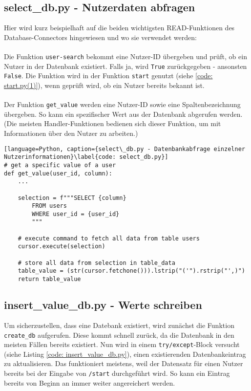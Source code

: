         \subsection{select\_db.py - Nutzerdaten abfragen} \label{Implementierung: select_db.py}
            Hier wird kurz beispielhaft auf die beiden wichtigsten READ-Funktionen des Database-Connectors hingewiesen und wo sie verwendet werden: \\
            \\
            Die Funktion \verb|user-search| bekommt eine Nutzer-ID übergeben und prüft, ob ein Nutzer in der Datenbank existiert. Falls ja, wird \verb|True| zurückgegeben - ansonsten \verb|False|. Die Funktion wird in der Funktion \verb|start| genutzt (siehe \ref*{code: start.py(1)}), wenn geprüft wird, ob ein Nutzer bereits bekannt ist.\\ 
            \\
            Der Funktion \verb|get_value| werden eine Nutzer-ID sowie eine Spaltenbezeichnung übergeben. So kann ein spezifischer Wert aus der Datenbank abgerufen werden. (Die meisten Handler-Funktionen bedienen sich dieser Funktion, um mit Informationen über den Nutzer zu arbeiten.) 
                \begin{lstlisting}[language=Python, caption={select\_db.py - Datenbankabfrage einzelner Nutzerinformationen}\label{code: select_db.py}]
# get a specific value of a user
def get_value(user_id, column):
    ...

    selection = f"""SELECT {column}
        FROM users
        WHERE user_id = {user_id}
        """

    # execute command to fetch all data from table users
    cursor.execute(selection)

    # store all data from selection in table_data
    table_value = (str(cursor.fetchone())).lstrip("('").rstrip("',)")
    return table_value
                \end{lstlisting}

        \subsection{insert\_value\_db.py - Werte schreiben} \label{Implementierung: insert_value_db.py}
            Um sicherzustellen, dass eine Datebank existiert, wird zunächst die Funktion \verb|create_db| aufgerufen. Diese kommt schnell zurück, da die Datenbank in den meisten Fällen bereits existiert. Nun wird in einem \verb|try/except|-Block versucht (siehe Listing \ref*{code: insert_value_db.py}), einen existierenden Datenbankeintrag zu aktualisieren. Das funktioniert meistens, weil der Datensatz für einen Nutzer bereits bei der Eingabe von \verb|/start| durchgeführt wird. So kann ein Eintrag bereits von Beginn an immer weiter angereichert werden.

